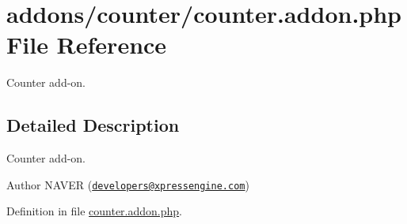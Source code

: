 \hypertarget{counter_8addon_8php}{\section{addons/counter/counter.addon.\-php File Reference}
\label{counter_8addon_8php}
}


Counter add-\/on.  




\subsection{Detailed Description}
Counter add-\/on. \begin{DoxyAuthor}{Author}
N\-A\-V\-E\-R (\href{mailto:developers@xpressengine.com}{\tt developers@xpressengine.\-com}) 
\end{DoxyAuthor}


Definition in file \hyperlink{counter_8addon_8php_source}{counter.\-addon.\-php}.

